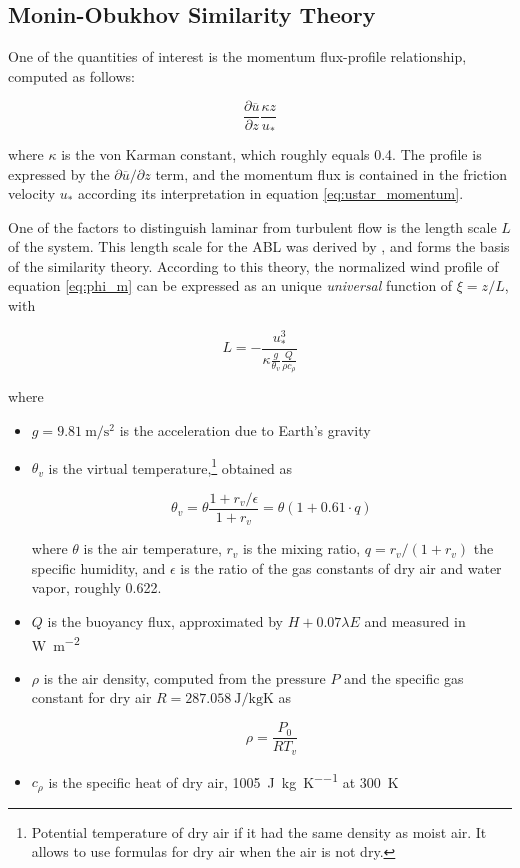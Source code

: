 \documentclass[a4paper,11pt]{kth-mag}
\begin{document}
\subsection{Monin-Obukhov Similarity Theory}
\label{sec:most}
One of the quantities of interest is the momentum flux-profile relationship, computed as follows:

\begin{equation}
\label{eq:phi_m}
\frac{\partial\overline{u}}{\partial z}\frac{\kappa z}{u_*}
\end{equation}

\noindent where $\kappa$ is the von Karman constant, which roughly equals 0.4. The profile is expressed by the $\partial\overline{u}/\partial z$ term, and the momentum flux is contained in the friction velocity $u_*$ according its interpretation in equation \ref{eq:ustar_momentum}.

One of the factors to distinguish laminar from turbulent flow is the length scale $L$ of the system. This length scale for the ABL was derived by \cite{mostayyyy}, and forms the basis of the similarity theory. According to this theory, the normalized wind profile of equation \ref{eq:phi_m} can be expressed as an unique \emph{universal} function of $\xi=z/L$, with

\begin{equation}
\label{eq:most_l}
L=-\frac{u_*^3}{\kappa\frac{g}{\theta_v}\frac{Q}{\rho c_\rho}}
\end{equation}

\noindent where

\begin{itemize}
\item $g=\SI{9.81}{\meter\per\square\second}$ is the acceleration due to Earth's gravity

\item $\theta_v$ is the virtual temperature,\footnote{Potential temperature of dry air if it had the same density as moist air. It allows to use formulas for dry air when the air is not dry.} obtained as

\begin{equation}
\label{eq:vtemp}
\theta_v=\theta\frac{1+r_v/\epsilon}{1+r_v}=\theta(1+0.61\cdot q)
\end{equation}

\noindent where $\theta$ is the air temperature, $r_v$ is the mixing ratio, $q=r_v/(1+r_v)$ the specific humidity, and $\epsilon$ is the ratio of the gas constants of dry air and water vapor, roughly 0.622.

\item $Q$ is the buoyancy flux, approximated by $H+0.07\lambda E$ and measured in \si{\watt\per\square\meter}

\item $\rho$ is the air density, computed from the pressure $P$ and the specific gas constant for dry air $R=\SI{287.058}{\joule\per\kilo\gram\kelvin}$ as

$$
\rho=\frac{P_0}{RT_v}
$$


\item $c_\rho$ is the specific heat of dry air, \SI{1005}{\joule\per\kilo\gram\per\kelvin} at \SI{300}{\kelvin}
\end{itemize}
\end{document}
